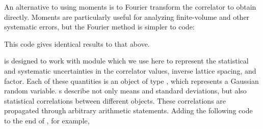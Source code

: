 \documentclass[letterpaper,10pt,english]{sphinxmanual}
\begin{document}
An alternative to using moments is to Fourier transform the
correlator to obtain  directly. Moments are particularly
useful for analyzing finite-volume and other systematic errors, but
the Fourier method is simpler to code:

\begin{sphinxVerbatim}[commandchars=\\\{\}]
     
   
 

      
\end{sphinxVerbatim}

This code gives identical results to that above.

{\hyperref[\detokenize{g2tools:module-g2tools}]{}} is designed to work with module  which we use here
to represent the statistical and systematic uncertainties in
the correlator values, inverse lattice spacing, and  factor. Each of these
quantities is an object of type , which represents
a Gaussian random variable. s describe not only
means and standard deviations, but also statistical correlations between
different objects. These correlations are propagated through arbitrary
arithmetic statements. Adding the following code to the end of ,
for example,

\begin{sphinxVerbatim}[commandchars=\\\{\}]
\PYG{p}{[}\PYG{p}{[}\PYG{p}{]} \PYG{p}{[}\PYG{p}{]} \PYG{p}{[}\PYG{p}{]} \PYG{p}{[}\PYG{p}{]}\PYG{p}{]}
\end{sphinxVerbatim}
\end{document}
